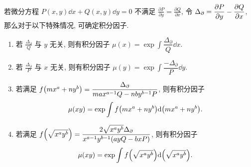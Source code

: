 \begin{theorem}[积分因子]
    若微分方程 $P(x,y)\dd x+Q(x,y)\dd y=0$ 不满足 $\displaystyle\frac{\partial P}{\partial y}=\frac{\partial Q}{\partial x}$,
    令 $\Delta _\partial=\displaystyle\pdv{P}{y}-\pdv{Q}{x}$, 那么对于以下特殊情况, 可确定积分因子.
    \begin{enumerate}[label=(\arabic{*})]
        \item 若 $\displaystyle\frac{\Delta _\partial}{Q}$ 与 $y$ 无关, 则有积分因子 $\displaystyle\mu(x)=\exp\int\dfrac{\Delta_\partial}{Q}\dd x.$
        \item 若 $\displaystyle\frac{\Delta _\partial}{P}$ 与 $x$ 无关, 则有积分因子 $\displaystyle\mu(y)=\exp\int\dfrac{-\Delta_\partial}{P}\dd y.$
        \item 若满足 $f\qty(mx^a+ny^b)=\dfrac{\Delta _\partial}{max^{a-1}Q-nby^{b-1}P}$, 则有积分因子 $$\mu(xy)=\exp\int f\qty(mx^a+ny^b)\dd \qty(mx^a+ny^b).$$
        \item 若满足 $f\qty(\sqrt{x^ay^b})=\dfrac{2\sqrt{x^ay^b}\Delta_\partial}{x^{a-1}y^{b-1}(ayQ-bxP)}$, 则有积分因子
              $$\mu(xy)=\exp\int f\qty(\sqrt{x^ay^b})\dd \qty(\sqrt{x^ay^b}).$$
    \end{enumerate}
\end{theorem}


